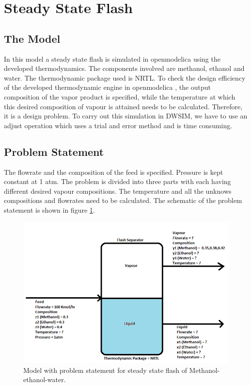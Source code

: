 \documentclass[12pt]{report}
\begin{document}
\section{Steady State Flash}
\subsection{The Model}
In this model a steady state flash is simulated in openmodelica using the developed thermodynamics. The components involved are methanol, ethanol and water. The thermodynamic package used is NRTL. To check the design efficiency of the developed thermodynamic engine in openmodelica , the output composition of the vapor product is specified, while the temperature at which this desired composition of vapour is attained needs to be calculated. Therefore, it is a design problem. To carry out this simulation in DWSIM, we have to use an adjust operation which uses a trial and error method and is time consuming.

\subsection{Problem Statement}
The flowrate and the composition of the feed is specified. Pressure is kept constant at 1 atm. The problem is divided into three parts with each having different desired vapour compositions. The temperature and all the unknows compositions and flowrates need to be calculated. The schematic of the problem statement is shown in figure \ref{Flash}.

\begin{figure}
\centering
\includegraphics[width=0.8\linewidth]{Flash}
\caption{Model with problem statement for steady state flash of Methanol-ethanol-water.}
\label{Flash}
\end{figure}
\end{document}
